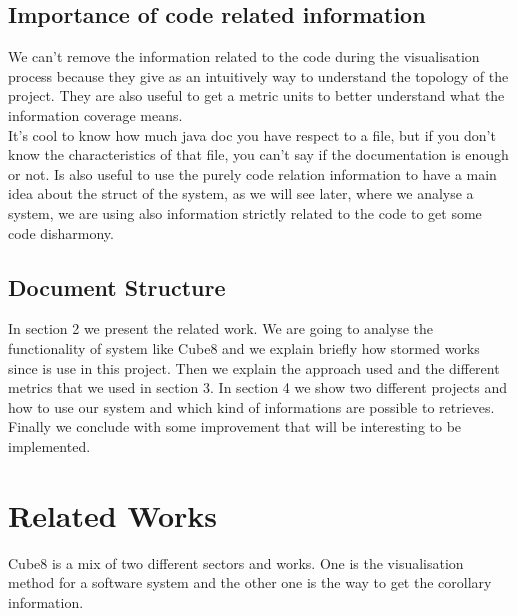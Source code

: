 \documentclass[]{usiinfbachelorproject}
\begin{document}
\subsection{Importance of code related information} 
We can't remove the information related to the code during the visualisation process because they give as an intuitively way to understand the topology of the project.
They are also useful to get a metric units to better understand what the information coverage means.\\ It's cool to know how much java doc you have respect to a file, but if you don't know the characteristics of that file, you can't say if the documentation is enough or not. Is also useful to use the purely code relation information to have a main idea about the struct of the system, as we will see later, where we analyse a system, we are using also information strictly related to the code to get some code disharmony.

\subsection{Document Structure} 
In section 2 we present the related work. We are going to analyse the functionality of system like Cube8 and we explain briefly how stormed works since is use in this project.
Then we explain the approach used and the different metrics that we used in section 3.
In section 4 we show  two different projects and how to use our system and which kind of informations are possible to retrieves.
Finally we conclude with some improvement that will be interesting  to be implemented.


\newpage


  
\section{Related Works} \label{related works}
Cube8 is a mix of two different sectors and works. One is the visualisation method for a software system and the other one is the way to get the corollary information.\\
\end{document}
